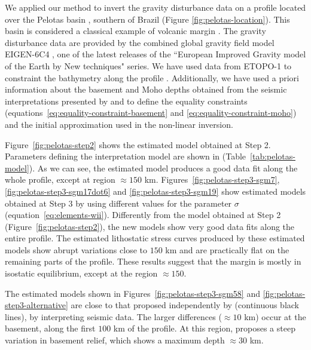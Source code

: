\documentclass[manuscript]{geophysics}
\begin{document}
We applied our method to invert the gravity disturbance data 
on a profile located over the Pelotas basin
\citep{stica-etal2014}, southern of Brazil (Figure \ref{fig:pelotas-location}). This basin is 
considered a classical example of volcanic margin \citep{geoffroy2005}.
The gravity disturbance data are provided by the combined global gravity field model EIGEN-6C4
\citep{forste2014}, one of the latest releases of the ``European Improved Gravity model of 
the Earth by New techniques" series.
We have used data from ETOPO-1 to constraint the bathymetry along the profile
\citep{amante-eakins2009}.
Additionally, we have used a priori information about the basement and Moho depths
obtained from the seismic interpretations presented by \citet{stica-etal2014} and
\citet{zalan2015} to define the equality constraints 
(equations~\ref{eq:equality-constraint-basement} and \ref{eq:equality-constraint-moho})
and the initial approximation used in the non-linear inversion. 

Figure~\ref{fig:pelotas-step2} shows the estimated model obtained at Step 2.
Parameters defining the interpretation model are shown in 
(Table~\ref{tab:pelotas-model}).
As we can see, the estimated model produces a good data fit along the whole
profile, except at region $\approx 150$ km.
Figures~\ref{fig:pelotas-step3-sgm7}, \ref{fig:pelotas-step3-sgm17dot6} and 
\ref{fig:pelotas-step3-sgm19} show estimated models obtained at
Step 3 by using different values for the parameter $\sigma$
(equation~\ref{eq:elements-wii}).
Differently from the model obtained at Step 2 (Figure~\ref{fig:pelotas-step2}), 
the new models show very good data fits along the entire profile.
The estimated lithostatic stress curves produced by these estimated models 
show abrupt variations close to $150$ km and are practically flat on the remaining parts
of the profile. These results suggest that the margin is mostly in isostatic 
equilibrium, except at the region $\approx 150$.

The estimated models shown in Figures~\ref{fig:pelotas-step3-sgm58} and \ref{fig:pelotas-step3-alternative} 
are close to that proposed independently by \citet{zalan2015} (continuous black lines), by
interpreting seismic data.
The larger differences ($\approx 10$ km) occur at the basement, along the first 
$100$ km of the profile.
At this region, \citeauthor{zalan2015} proposes a steep variation in basement
relief, which shows a maximum depth $\approx 30$ km. 
\end{document}
